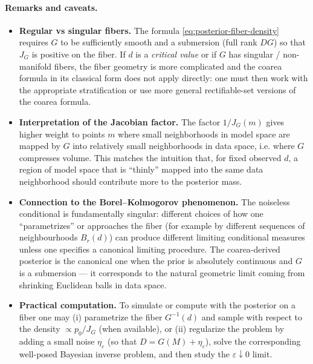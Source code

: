\documentclass[11pt]{article}
\theoremstyle{remark}
\begin{document}
\paragraph{Remarks and caveats.}
\begin{itemize}
  \item \textbf{Regular vs singular fibers.} The formula
    \eqref{eq:posterior-fiber-density} requires \(G\) to be sufficiently smooth
    and a submersion (full rank \(DG\)) so that \(J_G\) is positive on the fiber.
    If \(d\) is a \emph{critical value} or if \(G\) has singular / non-manifold
    fibers, the fiber geometry is more complicated and the coarea formula in
    its classical form does not apply directly: one must then work with the
    appropriate stratification or use more general rectifiable-set versions of the
    coarea formula.
  \item \textbf{Interpretation of the Jacobian factor.} The factor \(1/J_G(m)\)
    gives higher weight to points \(m\) where small neighborhoods in model space
    are mapped by \(G\) into relatively small neighborhoods in data space, i.e.
    where \(G\) compresses volume. This matches the intuition that, for fixed
    observed \(d\), a region of model space that is ``thinly'' mapped into the same
    data neighborhood should contribute more to the posterior mass.
  \item \textbf{Connection to the Borel–Kolmogorov phenomenon.}
    The noiseless conditional is fundamentally singular: different choices of how one
    ``parametrizes'' or approaches the fiber (for example by different sequences of
    neighbourhoods \(B_r(d)\)) can produce different limiting conditional measures
    unless one specifies a canonical limiting procedure. The coarea-derived posterior
    is the canonical one when the prior is absolutely continuous and \(G\) is a
    submersion — it corresponds to the natural geometric limit coming from shrinking
    Euclidean balls in data space.
  \item \textbf{Practical computation.} To simulate or compute with the posterior on a
    fiber one may (i) parametrize the fiber \(G^{-1}(d)\) and sample with respect to the
    density \(\propto p_0/J_G\) (when available), or (ii) regularize the problem by
    adding a small noise \(\eta_\varepsilon\) (so that \(D=G(M)+\eta_\varepsilon\)),
    solve the corresponding well-posed Bayesian inverse problem, and then study the
    \(\varepsilon\downarrow 0\) limit.
\end{itemize}
\end{document}

